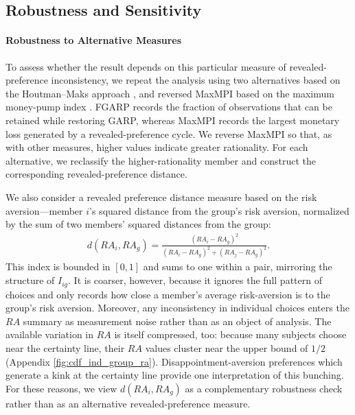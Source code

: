 \documentclass[11 pt]{article}
\begin{document}
\subsection{Robustness and Sensitivity}
\paragraph{Robustness to Alternative Measures} To assess whether the result depends on this particular measure of revealed-preference inconsistency, we repeat the analysis using two alternatives based on the Houtman--Maks approach \citep{houtman1985determining}, and reversed MaxMPI based on the maximum money-pump index \citep{echenique2011money}. FGARP records the fraction of observations that can be retained while restoring GARP, whereas MaxMPI records the largest monetary loss generated by a revealed-preference cycle. We reverse MaxMPI so that, as with other measures, higher values indicate greater rationality. For each alternative, we reclassify the higher-rationality member and construct the corresponding revealed-preference distance.

We also consider a revealed preference distance measure based on the risk aversion---member $i$'s squared distance from the group's risk aversion, normalized by the sum of two members' squared distances from the group:
\begin{align}\label{eqn:simple_measure}
d(RA_i, RA_g) = \frac{(RA_i - RA_g)^2}{(RA_i - RA_g)^2 + (RA_j - RA_g)^2}.
\end{align}
This index is bounded in $[0, 1]$ and sums to one within a pair, mirroring the structure of $I_{ig}$. It is  coarser, however, because it ignores the full pattern of choices and only records how close a member's average risk-aversion is to the group's risk aversion. Moreover, any inconsistency in individual choices enters the $RA$ summary as measurement noise rather than as an object of analysis.  The available variation in $RA$ is itself compressed, too: because many subjects choose near the certainty line, their $RA$ values cluster near the upper bound of $1/2$ (Appendix \autoref{fig:cdf_ind_group_ra}). Disappointment-aversion preferences which generate a kink at the certainty line  \citep{Gul:1991:ECMA} provide one interpretation of this bunching. For these reasons, we view $d(RA_i, RA_g)$ as a complementary robustness check rather than as an alternative revealed-preference measure.
\end{document}

